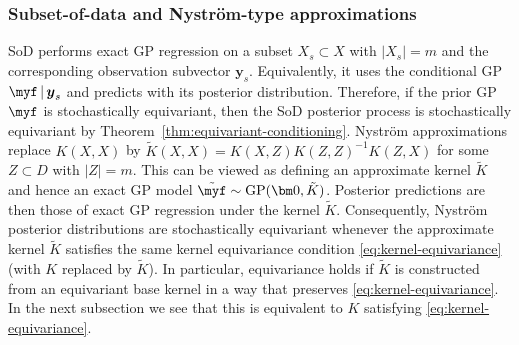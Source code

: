 \documentclass[11pt,a4paper]{article}
\newcommand{\by}{\boldsymbol{y}}
\begin{document}
\subsubsection{Subset-of-data and Nyström-type approximations}
\label{subsec:conseq-sod-nystrom}
SoD performs exact GP regression on a subset $X_s\subset X$ with $|X_s|=m$ and the corresponding observation subvector $\by_s$.
Equivalently, it uses the conditional GP $\myf\,|\,\by_s$ and predicts with its posterior distribution.
Therefore, if the prior GP $\myf$ is stochastically equivariant, then the SoD posterior process is stochastically equivariant by
Theorem~\ref{thm:equivariant-conditioning}.
Nyström approximations replace $K(X,X)$ by $\tilde K(X,X)=K(X,Z)K(Z,Z)^{-1}K(Z,X)$ for some $Z\subset D$ with $|Z|=m$.
This can be viewed as defining an {approximate kernel} $\tilde K$ and hence an exact GP model $\tilde{\myf}\sim\mathrm{GP}(\bm 0,\tilde K)$.
Posterior predictions are then those of exact GP regression under the kernel $\tilde K$. Consequently, Nyström posterior distributions are stochastically equivariant whenever the approximate kernel $\tilde K$ satisfies the same kernel equivariance condition \eqref{eq:kernel-equivariance} (with $K$ replaced by $\tilde K$). In particular, equivariance holds if $\tilde K$ is constructed from an equivariant base kernel in a way that preserves \eqref{eq:kernel-equivariance}. In the next subsection we see that this is equivalent to $K$ satisfying \eqref{eq:kernel-equivariance}.
\end{document}
